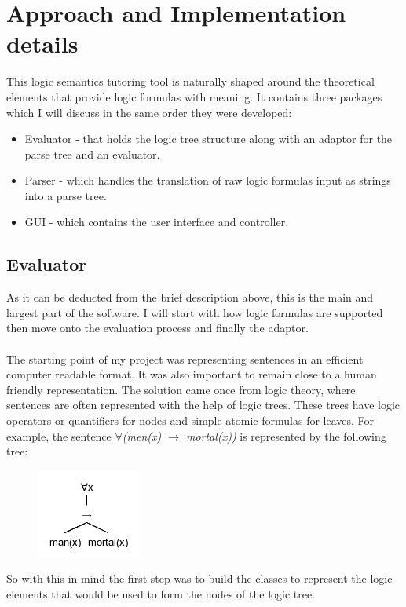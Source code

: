 \documentclass{report}
\begin{document}

\chapter{Approach and Implementation details}

This logic semantics tutoring tool is naturally shaped around the theoretical elements that provide logic formulas with meaning. It contains three packages which I will discuss in the same order they were developed:
\begin{itemize}
\item Evaluator - that holds the logic tree structure along with an adaptor for the parse tree and an evaluator.
\item Parser - which handles the translation of raw logic formulas input as strings into a parse tree.
\item GUI - which contains the user interface and controller.
\end{itemize}

\section{Evaluator}
As it can be deducted from the brief description above, this is the main and largest part of the software. I will start with how logic formulas are supported then move onto the evaluation process and finally the adaptor. \\ \\
The starting point of my project was representing sentences in an efficient computer readable format. It was also important to remain close to a human friendly representation. The solution came once from logic theory, where sentences are often represented with the help of logic trees. These trees have logic operators or quantifiers for nodes and simple atomic formulas for leaves. For example, the sentence \emph{$\forall$(men(x) $\rightarrow$ mortal(x))} is represented by the following tree:

\begin{figure}[h!]
\centering \includegraphics{mortal.png}
\end{figure}
\newpage \noindent
So with this in mind the first step was to build the classes to represent the logic elements that would be used to form the nodes of the logic tree.
\end{document}
